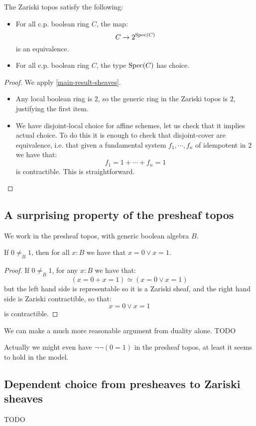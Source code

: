 \begin{proposition}
The Zariski topos satisfy the following:
\begin{itemize}
\item For all c.p. boolean ring $C$, the map:
\[C\to 2^{\operatorname{Spec}(C)}\]
is an equivalence.
\item For all c.p. boolean ring $C$, the type $\operatorname{Spec}(C)$ has choice.
\end{itemize}
\end{proposition}

\begin{proof}
We apply \cref{main-result-sheaves}. 
\begin{itemize}
\item Any local boolean ring is $2$, so the generic ring in the Zariski topos is $2$, justifying the first item.
\item We have disjoint-local choice for affine schemes, let us check that it implies actual choice. To do this it is enough to check that disjoint-cover are equivalence, i.e. that given a fundamental system $f_1,\cdots,f_n$ of idempotent in $2$ we have that:
\[f_1=1 + \cdots + f_n=1\]
is contractible. This is straightforward.
\end{itemize}
\end{proof}


\subsection{A surprising property of the presheaf topos}

We work in the presheaf topos, with generic boolean algebra $B$.

\begin{lemma}
If $0\not=_B1$, then for all $x:B$ we have that $x=0\lor x=1$.
\end{lemma}

\begin{proof}
If $0\not=_B1$, for any $x:B$ we have that:
\[(x=0+x=1) \simeq (x=0\lor x=1)\]
but the left hand side is representable so it is a Zariski sheaf, and the right hand side is Zariski contractible, so that:
\[x=0\lor x=1\]
is contractible.
\end{proof}

\begin{remark}
We can make a much more reasonable argument from duality alone. TODO
\end{remark}

\begin{remark}
Actually we might even have $\neg\neg(0=1)$ in the presheaf topos, at least it seems to hold in the model.
\end{remark}


\subsection{Dependent choice from presheaves to Zariski sheaves}

TODO
